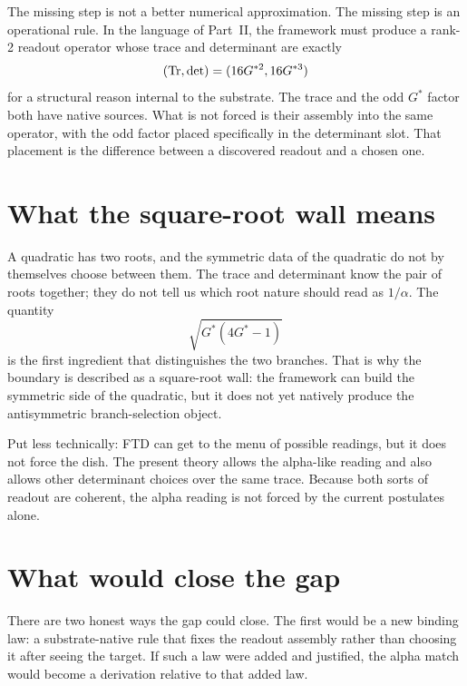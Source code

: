 \medskip
\noindent The missing step is not a better numerical approximation. The missing
step is an operational rule. In the language of Part~II, the framework must
produce a rank-2 readout operator whose trace and determinant are exactly
\[
  (\operatorname{Tr},\operatorname{det})=(16G^{*2},16G^{*3})
\]
for a structural reason internal to the substrate. The trace and the odd
$G^*$ factor both have native sources. What is not forced is their assembly into
the same operator, with the odd factor placed specifically in the determinant
slot. That placement is the difference between a discovered readout and a chosen
one.

\section*{What the square-root wall means}

\noindent A quadratic has two roots, and the symmetric data of the quadratic do
not by themselves choose between them. The trace and determinant know the pair of
roots together; they do not tell us which root nature should read as
$1/\alpha$. The quantity
\[
  \sqrt{G^*(4G^*-1)}
\]
is the first ingredient that distinguishes the two branches. That is why the
boundary is described as a square-root wall: the framework can build the
symmetric side of the quadratic, but it does not yet natively produce the
antisymmetric branch-selection object.

\medskip
\noindent Put less technically: FTD can get to the menu of possible readings,
but it does not force the dish. The present theory allows the alpha-like reading
and also allows other determinant choices over the same trace. Because both
sorts of readout are coherent, the alpha reading is not forced by the current
postulates alone.

\section*{What would close the gap}

\noindent There are two honest ways the gap could close. The first would be a
new binding law: a substrate-native rule that fixes the readout assembly rather
than choosing it after seeing the target. If such a law were added and justified,
the alpha match would become a derivation relative to that added law.

